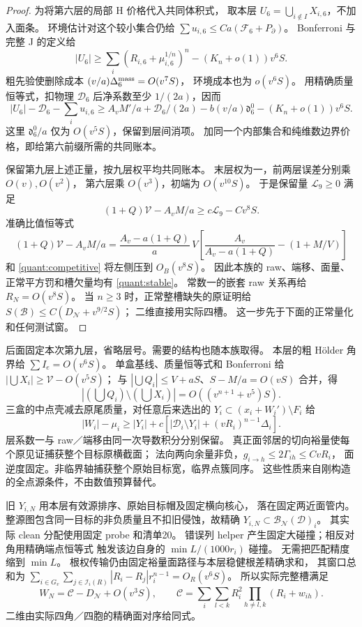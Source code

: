 \begin{proof}
为将第六层的局部 H 价格代入共同体积式，
取本层 \(U_6=\bigcup_{i\notin I}X_{i,6}\)，不加入面条。
环境估计对这个较小集合仍给
\(\sum u_{i,6}\le Ca(\mathcal F_6+P_\partial)\)。
Bonferroni 与完整 J 的定义给
\[
 |U_6|\ge\sum_i(R_{i,6}+\mu_{i,6}^{1/n})^n
                         -(K_n+o(1))v^6S .
\]
粗先验使删除成本
\((v/a)\Delta_6^{\rm mass}=O(v^7S)\)，
环境成本也为 \(o(v^6S)\)。
用精确质量恒等式，扣物理 \(\mathcal D_6\) 后净系数至少
\(1/(2a)\)，因而
\[
 |U_6|-\mathcal D_6-\sum_i u_{i,6}
 \ge A_vM'/a+\mathcal D_6/(2a)
       -b(v/a)\mathfrak d_6^0-(K_n+o(1))v^6S .
\]
这里 \(\mathfrak d_6^0/a\) 仅为 \(O(v^5S)\)，保留到层间消项。
加同一个内部集合和纯维数边界价格，即给第六前缀所需的共同账本。

保留第九层上述正量，按九层权平均共同账本。
末层权为一，前两层误差分别乘 \(O(v),\allowbreak O(v^2)\)，
第六层乘 \(O(v^3)\)，初端为 \(O(v^{10}S)\)。
于是保留量 \(\mathcal L_9\ge0\) 满足
\[
 (1+Q)\mathcal V-A_vM/a\ge c\mathcal L_9-Cv^8S.
\]
准确比值恒等式
\[
 (1+Q)\mathcal V-A_vM/a
 =\frac{A_v-a(1+Q)}a\,V
   \left[\frac{A_v}{A_v-a(1+Q)}-(1+M/V)\right]
\]
和 \eqref{quant:competitive} 将左侧压到 \(O_B(v^8S)\)。
因此本族的 raw、端移、面量、正常平方罚和槽欠量均有
\eqref{quant:stable}。
常数一的嵌套 raw 关系再给 \(R_N=O(v^8S)\)。
当 \(n\ge3\) 时，正常整槽缺失的原证明给
\(S(\mathcal B)\le C(D_{\mathcal N}+v^{9/2}S)\)；
二维直接用实际四槽。
这一步先于下面的正常量化和任何测试窗。
\end{proof}

后面固定本次第九层，省略层号。需要的结构也随本族取得。
本层的粗 Hölder 角界给 \(\sum I_e=O(v^6S)\)。
单盒基线、质量恒等式和 Bonferroni 给
\(|\bigcup X_i|\ge\mathcal V-O(v^5S)\)；
与 \(|\bigcup Q_i|\le V+aS\)、\(S-M/a=O(vS)\) 合并，得
\[
 \left|(\bigcup Q_i)\setminus(\bigcup X_i)\right|
                    =O((v^{n+1}+v^5)S).
\]
三盒的中点壳减去原尾质量，对任意后来选出的
\(Y_i\subset(x_i+W_i')\setminus F_i\) 给
\[
 |W_i|-\mu_i\ge |Y_i|+
 c[|\mathscr D_i\setminus Y_i|+(vR_i)^{n-1}\Delta_i].
\]
层系数一与 raw／端移由同一次导数积分分别保留。
真正面邻居的切向裕量使每个原见证捕获整个目标原横截面；
法向两向余量非负，\(g_{i\to h}\le2\Gamma_{ih}\le CvR_i\)，
面逆度固定。非临界轴捕获整个原始目标宽，临界点簇同序。
这些性质来自刚构造的全点源条件，不由数值预算替代。

旧 \(Y_{i,N}\) 用本层有效源排序、原始目标帽及固定横向核心，
落在固定两近面管内。
整源图包含同一目标的非负质量且不扣旧侵蚀，故精确
\(Y_{i,N}\subset\mathscr B_{\mathcal N}(\mathscr D)_i\)。
其实际 clean 分配使用固定 probe 和清单20。
错误列 helper 产生固定大碰撞；相反对角用精确端点恒等式
触发该边自身的 \(\min L/(1000r_i)\) 碰撞。
无需把匹配精度缩到 \(\min L\)。
根权传输仍由固定裕量面路径与本层稳健根差精确求和，
其窗口总和为
\(\sum_{i\in G_v}\sum_{j\in\mathcal I_i(R)}
 |R_i-R_j|r_i^{n-1}=O_R(v^6S)\)。
所以实际完整槽满足
\begin{equation}\label{quant:slots}
 W_N=\mathcal C-D_{\mathcal N}+O(v^3S),\qquad
 \mathcal C=\sum_i\sum_{l<k}R_i^2\prod_{h\ne l,k}(R_i+w_{ih}).
\end{equation}
二维由实际四角／四胞的精确面对序给同式。

